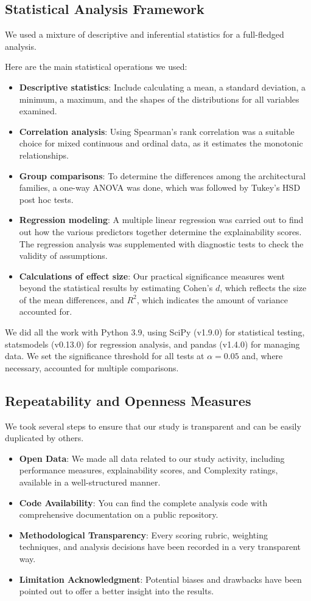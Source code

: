 \documentclass[preprint,12pt]{elsarticle}
\begin{document}
\subsection{Statistical Analysis Framework}
We used a mixture of descriptive and inferential statistics for a full-fledged analysis.

Here are the main statistical operations we used:
\begin{itemize}
   \item \textbf{Descriptive statistics}: Include calculating a mean, a standard deviation, a minimum, a maximum, and the shapes of the distributions for all variables examined.
   \item \textbf{Correlation analysis}: Using Spearman's rank correlation was a suitable choice for mixed continuous and ordinal data, as it estimates the monotonic relationships.
   \item \textbf{Group comparisons}: To determine the differences among the architectural families, a one-way ANOVA was done, which was followed by Tukey's HSD post hoc tests.
   \item \textbf{Regression modeling}: A multiple linear regression was carried out to find out how the various predictors together determine the explainability scores. The regression analysis was supplemented with diagnostic tests to check the validity of assumptions. 
   \item \textbf{Calculations of effect size}: Our practical significance measures went beyond the statistical results by estimating Cohen's $d$, which reflects the size of the mean differences, and $R^2$, which indicates the amount of variance accounted for.
\end{itemize}

We did all the work with Python 3.9, using SciPy (v1.9.0) for statistical testing, statsmodels (v0.13.0) for regression analysis, and pandas (v1.4.0) for managing data. We set the significance threshold for all tests at $\alpha = 0.05$ and, where necessary, accounted for multiple comparisons.

\subsection{Repeatability and Openness Measures}
We took several steps to ensure that our study is transparent and can be easily duplicated by others.
\begin{itemize}
   \item \textbf{Open Data}: We made all data related to our study activity, including performance measures, explainability scores, and Complexity ratings, available in a well-structured manner.
   \item \textbf{Code Availability}: You can find the complete analysis code with comprehensive documentation on a public repository.  
   \item \textbf{Methodological Transparency}: Every scoring rubric, weighting techniques, and analysis decisions have been recorded in a very transparent way. 
   \item \textbf{Limitation Acknowledgment}: Potential biases and drawbacks have been pointed out to offer a better insight into the results.
\end{itemize}
\end{document}
